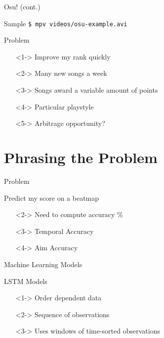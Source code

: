 \documentclass[table]{beamer}
\begin{document}
\begin{frame}{Osu! (cont.)}
  \begin{block}{Sample}
    \texttt{\$ mpv videos/osu-example.avi}
  \end{block}
\end{frame}

\begin{frame}{Problem}
  \begin{itemize}
  \item[]<1-> Improve my rank quickly
  \item[]<2-> Many new songs a week
  \item[]<3-> Songs award a variable amount of points
  \item[]<4-> Particular playstyle
  \item[]<5-> Arbitrage opportunity?
  \end{itemize}
\end{frame}

\section{Phrasing the Problem}

\begin{frame}{Problem}
  \begin{block}{Predict my score on a beatmap}
    \begin{itemize}
    \item[]<2-> Need to compute accuracy \%
    \item[]<3-> Temporal Accuracy
    \item[]<4-> Aim Accuracy
    \end{itemize}
  \end{block}
\end{frame}

\begin{frame}{Machine Learning Models}
\end{frame}

\begin{frame}{LSTM Models}
  \begin{itemize}
  \item[]<1-> Order dependent data
  \item[]<2-> Sequence of observations
  \item[]<3-> Uses windows of time-sorted observations
  \end{itemize}
\end{frame}
\end{document}

